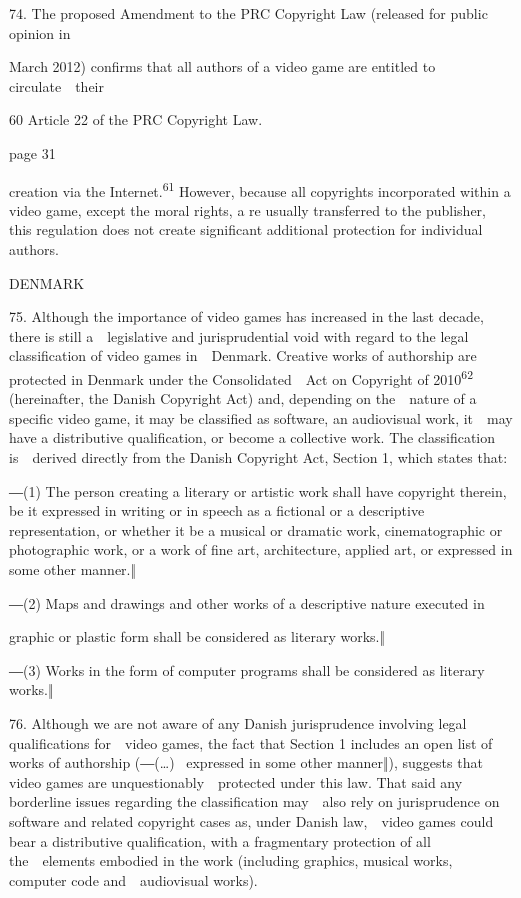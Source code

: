 \documentclass[
]{article}
\begin{document}
{74. }{The proposed Amendment to the PRC }{Copyright Law }{(released for
public opinion in}

{March 2012) confirms that all authors of a video game are entitled to
circulate~~their}

{60 }{Article 22 of the PRC }{Copyright Law.}

{page 31}

{creation via the Internet.}\textsuperscript{{61 }}{However, because all
copyrights incorporated within a video game, except the moral rights, a
re usually transferred to the publisher, this regulation does not create
significant additional protection for individual authors.}

{DENMARK}

{75. }{Although the importance of video games has increased in the last
decade, there is still a~~legislative and jurisprudential void with
regard to the legal classification of video games in~~Denmark. Creative
works of authorship are protected in Denmark under the
}{Consolidated~~Act on Copyright of 2010}\textsuperscript{{62
}}{(hereinafter, the Danish }{Copyright Act}{) and, depending on
the~~nature of a specific video game, it may be classified as software,
an audiovisual work, it~~may have a distributive qualification, or
become a collective work. The classification is~~derived directly from
the Danish }{Copyright Act}{, Section 1, which states that:}

{―(1) The person creating a literary or artistic work shall have
copyright therein, }{be it expressed in writing or in speech as a
fictional or a descriptive representation, or whether it be a musical or
dramatic work, cinematographic or photographic work, or a work of fine
art, architecture, applied art, or }{expressed in some other manner.‖}

{―(2) Maps and drawings and other works of }{a descriptive nature
executed in}

{graphic or plastic form shall be considered as literary works.‖}

{―(3) Works in the form of computer programs shall be considered as
literary works.‖}

{76. }{Although we are not aware of any Danish jurisprudence involving
legal qualifications for~~video games, the fact that Section 1 includes
an open list of works of authorship (}{―}{(\ldots) }{~expressed in some
other manner‖)}{, suggests that video games are
unquestionably~~protected under this law. That said any borderline
issues regarding the classification may~~also rely on jurisprudence on
software and related copyright cases as, under Danish law,~~video games
could bear a distributive qualification, with a fragmentary protection
of all the~~elements embodied in the work (including graphics, musical
works, computer code and~~audiovisual works).}
\end{document}
